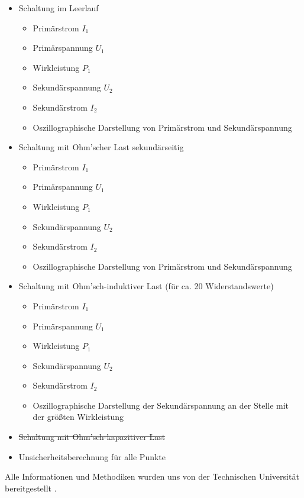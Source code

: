 \documentclass[12pt,a4paper,twoside]{article}
\begin{document}
\begin{itemize}
    \item Schaltung im Leerlauf
    \begin{itemize}
        \item Primärstrom $I_{1}$
        \item Primärspannung $U_{1}$
        \item Wirkleistung $P_{1}$
        \item Sekundärspannung $U_{2}$
        \item Sekundärstrom $I_{2}$
        \item Oszillographische Darstellung von Primärstrom und Sekundärspannung
    \end{itemize}
    \item Schaltung mit Ohm'scher Last sekundärseitig
    \begin{itemize}
        \item Primärstrom $I_{1}$
        \item Primärspannung $U_{1}$
        \item Wirkleistung $P_{1}$
        \item Sekundärspannung $U_{2}$
        \item Sekundärstrom $I_{2}$
        \item Oszillographische Darstellung von Primärstrom und Sekundärspannung
    \end{itemize}
    \item Schaltung mit Ohm'sch-induktiver Last (für ca. 20 Widerstandswerte)
    \begin{itemize}
        \item Primärstrom $I_{1}$
        \item Primärspannung $U_{1}$
        \item Wirkleistung $P_{1}$
        \item Sekundärspannung $U_{2}$
        \item Sekundärstrom $I_{2}$
        \item Oszillographische Darstellung der Sekundärspannung an der Stelle mit der größten Wirkleistung
    \end{itemize}
    \item \sout{Schaltung mit Ohm'sch-kapazitiver Last}
    \item Unsicherheitsberechnung für alle Punkte
\end{itemize}

\noindent
Alle Informationen und Methodiken wurden uns von der Technischen Universität bereitgestellt \cite{teachcenter1}. 
\end{document}
